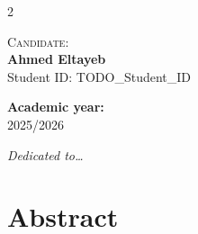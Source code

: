 \documentclass[12pt,a4paper,oneside,openright]{book}
\begin{document}
\begin{titlepage}
\begin{minipage}[t]{1\textwidth}
\begin{multicols}{2}
         \begin{flushright}
            {\normalsize{\textsc{Candidate:}}{\normalsize\vspace{1mm}
            \\ \normalsize{\textbf{Ahmed Eltayeb}}\\
            \vspace{2mm}
            \normalsize{Student ID: TODO\_Student\_ID}}} \\
         \end{flushright}
    \end{multicols}
\end{minipage}

\begin{center}
    \vspace{3mm}
    {\normalsize{\textbf{Academic year:}}{\normalsize\vspace{1mm}
    \\ \normalsize{2025/2026}}}
\end{center}

\end{titlepage}

\doublespacing

\cleardoublepage
\thispagestyle{empty}
\begin{flushright}
\itshape Dedicated to\ldots %
\end{flushright}
\cleardoublepage

\chapter*{Abstract}
\end{document}
